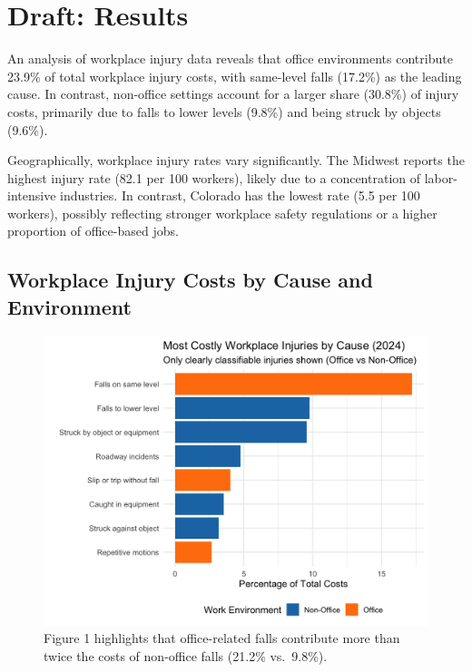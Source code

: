\documentclass[
  letterpaper,
  DIV=11,
  numbers=noendperiod]{scrreprt}
\begin{document}
\chapter{Draft: Results}\label{draft-results}

An analysis of workplace injury data reveals that office environments
contribute 23.9\% of total workplace injury costs, with same-level falls
(17.2\%) as the leading cause. In contrast, non-office settings account
for a larger share (30.8\%) of injury costs, primarily due to falls to
lower levels (9.8\%) and being struck by objects (9.6\%).

Geographically, workplace injury rates vary significantly. The Midwest
reports the highest injury rate (82.1 per 100 workers), likely due to a
concentration of labor-intensive industries. In contrast, Colorado has
the lowest rate (5.5 per 100 workers), possibly reflecting stronger
workplace safety regulations or a higher proportion of office-based
jobs.

\section{Workplace Injury Costs by Cause and
Environment}\label{workplace-injury-costs-by-cause-and-environment}

\begin{figure}[H]

{\centering \includegraphics[width=5.72917in,height=\textheight,keepaspectratio]{officecomparison.png}

}

\caption{Figure 1 highlights that office-related falls contribute more
than twice the costs of non-office falls (21.2\% vs.~9.8\%).}

\end{figure}%
\end{document}
